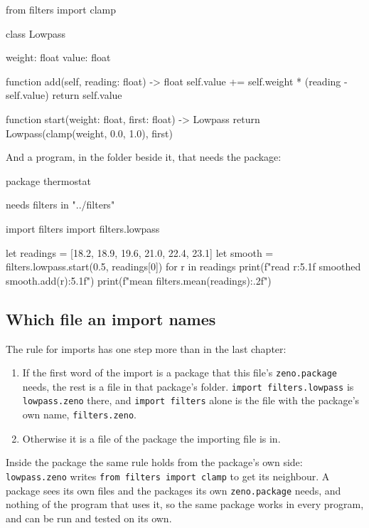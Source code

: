 \begin{zeno}[file=filters/lowpass.zeno, dir=thermo, run=no]
from filters import clamp

class Lowpass {
    weight: float
    value: float

    function add(self, reading: float) -> float {
        self.value += self.weight * (reading - self.value)
        return self.value
    }
}

function start(weight: float, first: float) -> Lowpass {
    return Lowpass(clamp(weight, 0.0, 1.0), first)
}
\end{zeno}

And a program, in the folder beside it, that needs the package:

\begin{zeno}[file=thermostat/zeno.package, dir=thermo, run=no]
package thermostat

needs filters in "../filters"
\end{zeno}

\begin{zeno}[file=thermostat/main.zeno, dir=thermo, cmd=zeno run thermostat/main.zeno]
import filters
import filters.lowpass

let readings = [18.2, 18.9, 19.6, 21.0, 22.4, 23.1]
let smooth = filters.lowpass.start(0.5, readings[0])
for r in readings {
    print(f"read {r:5.1f}  smoothed {smooth.add(r):5.1f}")
}
print(f"mean {filters.mean(readings):.2f}")
\end{zeno}

\subsection{Which file an import names}

The rule for imports has one step more than in the last chapter:

\begin{enumerate}
\item If the first word of the import is a package that this file's
  \verb|zeno.package| needs, the rest is a file in that package's
  folder. \verb|import filters.lowpass| is \verb|lowpass.zeno| there,
  and \verb|import filters| alone is the file with the package's own
  name, \verb|filters.zeno|.
\item Otherwise it is a file of the package the importing file is in.
\end{enumerate}

Inside the package the same rule holds from the package's own side:
\verb|lowpass.zeno| writes \verb|from filters import clamp| to get
its neighbour. A package sees its own files and the packages its own
\verb|zeno.package| needs, and nothing of the program that uses it, so
the same package works in every program, and can be run and tested on
its own.

